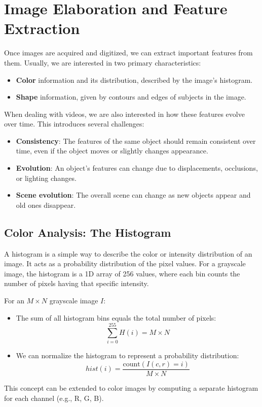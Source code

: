 \section{Image Elaboration and Feature Extraction}
Once images are acquired and digitized, we can extract important features from them. Usually, we are interested in two primary characteristics:
\begin{itemize}
    \item \textbf{Color} information and its distribution, described by the image's histogram.
    \item \textbf{Shape} information, given by contours and edges of subjects in the image.
\end{itemize}

When dealing with videos, we are also interested in how these features evolve over time. This introduces several challenges:
\begin{itemize}
    \item \textbf{Consistency}: The features of the same object should remain consistent over time, even if the object moves or slightly changes appearance.
    \item \textbf{Evolution}: An object's features can change due to displacements, occlusions, or lighting changes.
    \item \textbf{Scene evolution}: The overall scene can change as new objects appear and old ones disappear.
\end{itemize}

\subsection{Color Analysis: The Histogram}
A histogram is a simple way to describe the color or intensity distribution of an image. It acts as a probability distribution of the pixel values. 
For a grayscale image, the histogram is a 1D array of 256 values, where each bin counts the number of pixels having that specific intensity.

For an $M \times N$ grayscale image $I$:
\begin{itemize}
    \item The sum of all histogram bins equals the total number of pixels:
    \[ \sum_{i=0}^{255} H(i) = M \times N \]
    \item We can normalize the histogram to represent a probability distribution:
    \[ hist(i) = \frac{\text{count}(I(c,r) = i)}{M \times N} \]
\end{itemize}
This concept can be extended to color images by computing a separate histogram for each channel (e.g., R, G, B).

